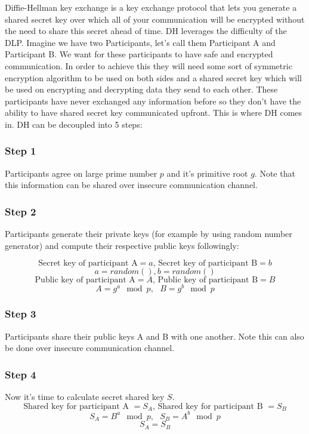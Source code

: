 \documentclass[bp,en]{FEIstyle}
\begin{document}
Diffie-Hellman key exchange is a key exchange protocol that lets you generate a shared secret key over which all of your communication will be encrypted without the need to share this secret ahead of time. DH leverages the difficulty of the DLP. Imagine we have two Participants, let's call them Participant A and Participant B. We want for these participants to have safe and encrypted communication. In order to achieve this they will need some sort of symmetric encryption algorithm to be used on both sides and a shared secret key which will be used on encrypting and decrypting data they send to each other. These participants have never exchanged any information before so they don't have the ability to have shared secret key communicated upfront. This is where DH comes in. DH can be decoupled into 5 steps:

\subsubsection*{Step 1}
Participants agree on large prime number $p$ and it's primitive root $g$. Note that this information can be shared over insecure communication channel.

\subsubsection*{Step 2}
Participants generate their private keys (for example by using random number generator) and compute their respective public keys followingly:

\[
\text{Secret key of participant A} = a \text{, Secret key of participant B} = b
\]
\[
a=random(), b=random()
\]
\[
\text{Public key of participant A} = A \text{, Public key of participant B} = B
\]
\[
A= g^a\mod p ,\text{ }B= g^b\mod p
\]

\subsubsection*{Step 3}
Participants share their public keys A and B with one another. Note this can also be done over insecure communication channel.

\subsubsection*{Step 4}
Now it's time to calculate secret shared key $S$. 
\[
\text{Shared key for participant A }= S_A\text{, Shared key for participant B }= S_B
\]
\[
S_A=B^a\mod p, \text{ }S_B=A^b\mod p 
\]
\[
S_A=S_B 
\]
\end{document}

